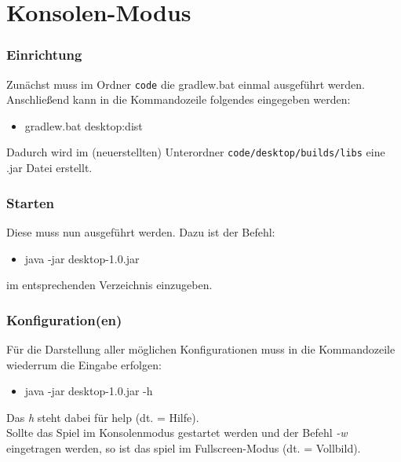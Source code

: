 \documentclass[12pt,a4paper,oneside]{book}
\theoremstyle{plain}
\numberwithin{equation}{chapter} \DeclareMathOperator{\Var}{Var}
\begin{document}
\chapter{Konsolen-Modus}
\subsection{Einrichtung}
    Zunächst muss im Ordner \texttt{code} die gradlew.bat einmal ausgeführt werden. Anschließend kann in die Kommandozeile folgendes eingegeben werden:
    \begin{itemize}
        \item gradlew.bat desktop:dist
    \end{itemize}
    Dadurch wird im (neuerstellten) Unterordner \texttt{code/desktop/builds/libs} eine .jar Datei erstellt.
    
\subsection{Starten}
    Diese muss nun ausgeführt werden. Dazu ist der Befehl:
    \begin{itemize}
        \item java -jar desktop-1.0.jar
    \end{itemize}
    im entsprechenden Verzeichnis einzugeben.

\subsection{Konfiguration(en)}
    Für die Darstellung aller möglichen Konfigurationen muss in die Kommandozeile wiederrum die Eingabe erfolgen:
    \begin{itemize}
        \item java -jar desktop-1.0.jar -h
    \end{itemize}
    Das \textit{h} steht dabei für help (dt. = Hilfe). \\
    
    Sollte das Spiel im Konsolenmodus gestartet werden und der Befehl \textit{-w} eingetragen werden, so ist das spiel im Fullscreen-Modus (dt. = Vollbild).
\end{document}
